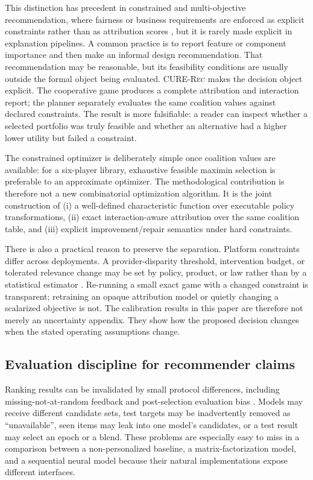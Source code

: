 \documentclass[review]{elsarticle}
\theoremstyle{plain}
\theoremstyle{definition}
\theoremstyle{remark}
\newcommand{\CURE}{\textsc{CURE-Rec}}
\begin{document}
This distinction has precedent in constrained and multi-objective recommendation, where fairness or business requirements are enforced as explicit constraints rather than as attribution scores \cite{wu2023multifr,chen2024interpolating}, but it is rarely made explicit in explanation pipelines. A common practice is to report feature or component importance and then make an informal design recommendation. That recommendation may be reasonable, but its feasibility conditions are usually outside the formal object being evaluated. \CURE{} makes the decision object explicit. The cooperative game produces a complete attribution and interaction report; the planner separately evaluates the same coalition values against declared constraints. The result is more falsifiable: a reader can inspect whether a selected portfolio was truly feasible and whether an alternative had a higher lower utility but failed a constraint.

The constrained optimizer is deliberately simple once coalition values are available: for a six-player library, exhaustive feasible maximin selection is preferable to an approximate optimizer. The methodological contribution is therefore not a new combinatorial optimization algorithm. It is the joint construction of (i) a well-defined characteristic function over executable policy transformations, (ii) exact interaction-aware attribution over the same coalition table, and (iii) explicit improvement/repair semantics under hard constraints.

There is also a practical reason to preserve the separation. Platform constraints differ across deployments. A provider-disparity threshold, intervention budget, or tolerated relevance change may be set by policy, product, or law rather than by a statistical estimator \cite{singh2018fairness,biega2018equity,ekstrand2022fairness,mehrabi2021survey,ge2020causal}. Re-running a small exact game with a changed constraint is transparent; retraining an opaque attribution model or quietly changing a scalarized objective is not. The calibration results in this paper are therefore not merely an uncertainty appendix. They show how the proposed decision changes when the stated operating assumptions change.

\subsection{Evaluation discipline for recommender claims}

Ranking results can be invalidated by small protocol differences, including missing-not-at-random feedback and post-selection evaluation bias \cite{yang2018unbiased,sun2020debiased,cawley2010selection}. Models may receive different candidate sets, test targets may be inadvertently removed as ``unavailable'', seen items may leak into one model's candidates, or a test result may select an epoch or a blend. These problems are especially easy to miss in a comparison between a non-personalized baseline, a matrix-factorization model, and a sequential neural model because their natural implementations expose different interfaces.
\end{document}
